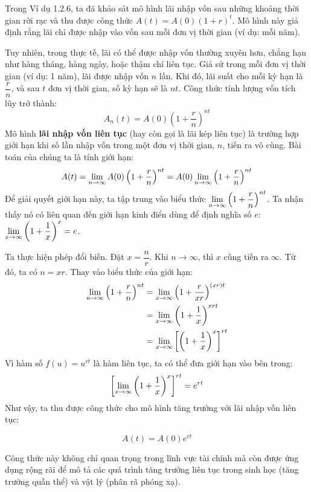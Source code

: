 \begin{example}
Trong Ví dụ 1.2.6, ta đã khảo sát mô hình lãi nhập vốn sau những khoảng thời gian rời rạc và thu được công thức $A(t) = A(0)(1 + r)^t$. Mô hình này giả định rằng lãi chỉ được nhập vào vốn sau mỗi đơn vị thời gian (ví dụ: mỗi năm).

Tuy nhiên, trong thực tế, lãi có thể được nhập vốn thường xuyên hơn, chẳng hạn như hàng tháng, hàng ngày, hoặc thậm chí liên tục. Giả sử trong mỗi đơn vị thời gian (ví dụ: 1 năm), lãi được nhập vốn $n$ lần. Khi đó, lãi suất cho mỗi kỳ hạn là $\dfrac{r}{n}$, và sau $t$ đơn vị thời gian, số kỳ hạn sẽ là $nt$. Công thức tính lượng vốn tích lũy trở thành:
$$ A_n(t) = A(0)\left(1 + \dfrac{r}{n}\right)^{nt} $$
Mô hình \textbf{lãi nhập vốn liên tục} (hay còn gọi là lãi kép liên tục) là trường hợp giới hạn khi số lần nhập vốn trong một đơn vị thời gian, $n$, tiến ra vô cùng. Bài toán của chúng ta là tính giới hạn:
$$ A(t) = \lim\limits_{n \to \infty} A(0)\left(1 + \dfrac{r}{n}\right)^{nt} = A(0) \lim\limits_{n \to \infty} \left(1 + \dfrac{r}{n}\right)^{nt} $$
Để giải quyết giới hạn này, ta tập trung vào biểu thức $\lim\limits_{n \to \infty} \left(1 + \dfrac{r}{n}\right)^{nt}$. Ta nhận thấy nó có liên quan đến giới hạn kinh điển dùng để định nghĩa số $e$: $\lim\limits_{x \to \infty} \left(1 + \dfrac{1}{x}\right)^x = e$.

Ta thực hiện phép đổi biến. Đặt $x = \dfrac{n}{r}$. Khi $n \to \infty$, thì $x$ cũng tiến ra $\infty$. Từ đó, ta có $n = xr$. Thay vào biểu thức của giới hạn:
\begin{align*}
\lim\limits_{n \to \infty} \left(1 + \dfrac{r}{n}\right)^{nt} &= \lim\limits_{x \to \infty} \left(1 + \dfrac{r}{xr}\right)^{(xr)t} \\
&= \lim\limits_{x \to \infty} \left(1 + \dfrac{1}{x}\right)^{xrt} \\
&= \lim\limits_{x \to \infty} \left[ \left(1 + \dfrac{1}{x}\right)^x \right]^{rt}
\end{align*}
Vì hàm số $f(u) = u^{rt}$ là hàm liên tục, ta có thể đưa giới hạn vào bên trong:
$$ \left[ \lim\limits_{x \to \infty} \left(1 + \dfrac{1}{x}\right)^x \right]^{rt} = e^{rt} $$
Như vậy, ta thu được công thức cho mô hình tăng trưởng với lãi nhập vốn liên tục:
\begin{importantbox}
$$ A(t) = A(0)e^{rt} $$
\end{importantbox}
Công thức này không chỉ quan trọng trong lĩnh vực tài chính mà còn được ứng dụng rộng rãi để mô tả các quá trình tăng trưởng liên tục trong sinh học (tăng trưởng quần thể) và vật lý (phân rã phóng xạ).
\end{example}

